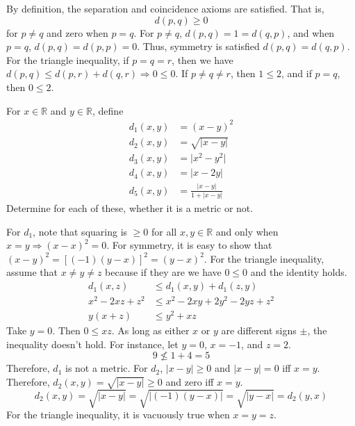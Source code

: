 \begin{exercise}
  \par\smallskip
  By definition, the separation and coincidence axioms are satisfied.
  That is,
  \[
  d(p, q)\geq 0
  \]
  for \(p\neq q\) and zero when \(p = q\).
  For \(p\neq q\), \(d(p,q) = 1 = d(q,p)\), and when \(p = q\),
  \(d(p,q) = d(p,p) = 0\).
  Thus, symmetry is satisfied \(d(p,q) = d(q,p)\).
  For the triangle inequality, if \(p = q = r\), then we have
  \(d(p,q)\leq d(p,r) + d(q,r)\Rightarrow 0\leq 0\).
  If \(p\neq q\neq r\), then \(1\leq 2\), and if \(p = q\), then \(0\leq 2\).
\item
  For \(x\in\mathbb{R}\) and \(y\in\mathbb{R}\), define
  \begin{align*}
    d_1(x, y) & = (x - y)^2\\
    d_2(x, y) & = \sqrt{\lvert x - y\rvert}\\
    d_3(x, y) & = \lvert x^2 - y^2\rvert\\
    d_4(x, y) & = \lvert x - 2y\rvert\\
    d_5(x, y) & = \frac{\lvert x - y\rvert}{1 + \lvert x - y\rvert}
  \end{align*}
  Determine for each of these, whether it is a metric or not.
  \par\smallskip
  For \(d_1\), note that squaring is \(\geq 0\) for all \(x,y\in\mathbb{R}\)
  and only when \(x = y\Rightarrow (x - x)^2 = 0\).
  For symmetry, it is easy to show that
  \((x - y)^2 = [(-1)(y - x)]^2 = (y - x)^2\).
  For the triangle inequality, assume that \(x\neq y\neq z\) because if they
  are we have \(0\leq 0\) and the identity holds.
  \begin{align*}
    d_1(x, z) & \leq d_1(x, y) + d_1(z, y)\\
    x^2 - 2xz + z^2 & \leq x^2 - 2xy + 2y^2 -2yz + z^2\\
    y(x + z) & \leq y^2 + xz
  \end{align*}
  Take \(y = 0\).
  Then \(0\leq xz\).
  As long as either \(x\) or \(y\) are different signs \(\pm\), the inequality
  doesn't hold.
  For instance, let \(y = 0\), \(x = -1\), and \(z = 2\).
  \[
  9\not\leq 1 + 4 = 5
  \]
  Therefore, \(d_1\) is not a metric.
  For \(d_2\), \(\lvert x - y\rvert\geq 0\) and \(\lvert x - y\rvert = 0\) iff
  \(x = y\).
  Therefore, \(d_2(x,y) = \sqrt{\lvert x - y\rvert}\geq 0\) and zero iff
  \(x = y\).
  \[
  d_2(x, y) = \sqrt{\lvert x - y\rvert} = \sqrt{\lvert (-1)(y - x)\rvert} =
  \sqrt{\lvert y - x\rvert} = d_2(y, x)
  \]
  For the triangle inequality, it is vacuously true when \(x = y = z\).
  \begin{align*}

\end{align*}
\end{exercise}
